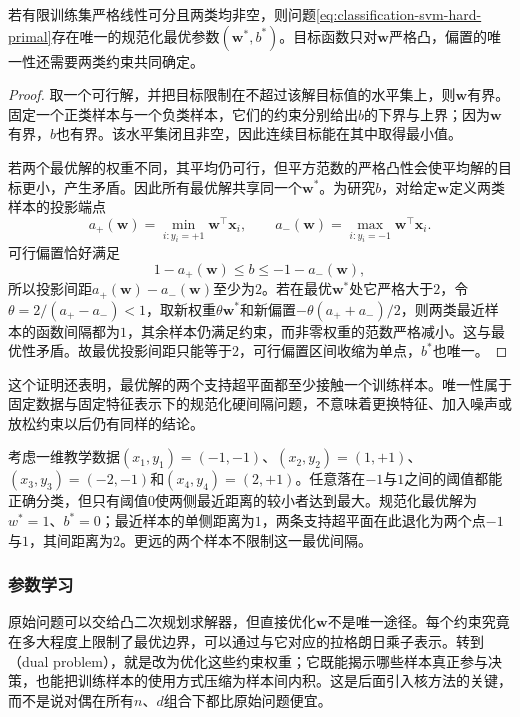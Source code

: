 \begin{theorem}[硬间隔解的存在性与唯一性]
  \label{thm:classification-svm-hard-unique}
  若有限训练集严格线性可分且两类均非空，则问题\eqref{eq:classification-svm-hard-primal}存在唯一的规范化最优参数$(\bm{w}^{\ast},b^{\ast})$。目标函数只对$\bm{w}$严格凸，偏置的唯一性还需要两类约束共同确定。
\end{theorem}
\begin{proof}
取一个可行解，并把目标限制在不超过该解目标值的水平集上，则$\bm{w}$有界。固定一个正类样本与一个负类样本，它们的约束分别给出$b$的下界与上界；因为$\bm{w}$有界，$b$也有界。该水平集闭且非空，因此连续目标能在其中取得最小值。

若两个最优解的权重不同，其平均仍可行，但平方范数的严格凸性会使平均解的目标更小，产生矛盾。因此所有最优解共享同一个$\bm{w}^{\ast}$。为研究$b$，对给定$\bm{w}$定义两类样本的投影端点
\[
  a_+(\bm{w})=\min_{i:y_i=+1}\bm{w}^{\top}\bm{x}_i,
  \qquad
  a_-(\bm{w})=\max_{i:y_i=-1}\bm{w}^{\top}\bm{x}_i.
\]
可行偏置恰好满足
\[
  1-a_+(\bm{w})\le b\le-1-a_-(\bm{w}),
\]
所以投影间距$a_+(\bm{w})-a_-(\bm{w})$至少为$2$。若在最优$\bm{w}^{\ast}$处它严格大于$2$，令$\theta=2/(a_+-a_-)<1$，取新权重$\theta\bm{w}^{\ast}$和新偏置$-\theta(a_++a_-)/2$，则两类最近样本的函数间隔都为$1$，其余样本仍满足约束，而非零权重的范数严格减小。这与最优性矛盾。故最优投影间距只能等于$2$，可行偏置区间收缩为单点，$b^{\ast}$也唯一。
\end{proof}

这个证明还表明，最优解的两个支持超平面都至少接触一个训练样本。唯一性属于固定数据与固定特征表示下的规范化硬间隔问题，不意味着更换特征、加入噪声或放松约束以后仍有同样的结论。

\begin{example}[单侧间隔与带宽]
  \label{ex:classification-svm-one-dimensional}
  考虑一维教学数据$(x_1,y_1)=(-1,-1)$、$(x_2,y_2)=(1,+1)$、$(x_3,y_3)=(-2,-1)$和$(x_4,y_4)=(2,+1)$。任意落在$-1$与$1$之间的阈值都能正确分类，但只有阈值$0$使两侧最近距离的较小者达到最大。规范化最优解为$w^{\ast}=1$、$b^{\ast}=0$；最近样本的单侧距离为$1$，两条支持超平面在此退化为两个点$-1$与$1$，其间距离为$2$。更远的两个样本不限制这一最优间隔。
\end{example}

\subsubsection{参数学习}
\label{sec:classification-svm-learning}

原始问题可以交给凸二次规划求解器，但直接优化$\bm{w}$不是唯一途径。每个约束究竟在多大程度上限制了最优边界，可以通过与它对应的拉格朗日乘子表示。转到（dual problem），就是改为优化这些约束权重；它既能揭示哪些样本真正参与决策，也能把训练样本的使用方式压缩为样本间内积。这是后面引入核方法的关键，而不是说对偶在所有$n$、$d$组合下都比原始问题便宜。

